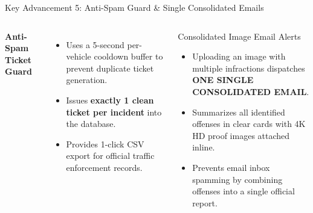 \documentclass[10pt, compress, aspectratio=169]{beamer}
\begin{document}
\begin{frame}{Key Advancement 5: Anti-Spam Guard \& Single Consolidated Emails}
    \begin{columns}[c]
        \textbf{\textcolor{BTPPrimary}{Anti-Spam Ticket Guard}}
        \vspace{2mm}
        \begin{itemize}\small
            \item Uses a 5-second per-vehicle cooldown buffer to prevent duplicate ticket generation.
            \item Issues \textbf{exactly 1 clean ticket per incident} into the database.
            \item Provides 1-click CSV export for official traffic enforcement records.
        \end{itemize}

        \begin{block}{Consolidated Image Email Alerts}
            \begin{itemize}\small
                \item Uploading an image with multiple infractions dispatches \textbf{ONE SINGLE CONSOLIDATED EMAIL}.
                \item Summarizes all identified offenses in clear cards with 4K HD proof images attached inline.
                \item Prevents email inbox spamming by combining offenses into a single official report.
            \end{itemize}
        \end{block}
    \end{columns}
\end{frame}
\end{document}
